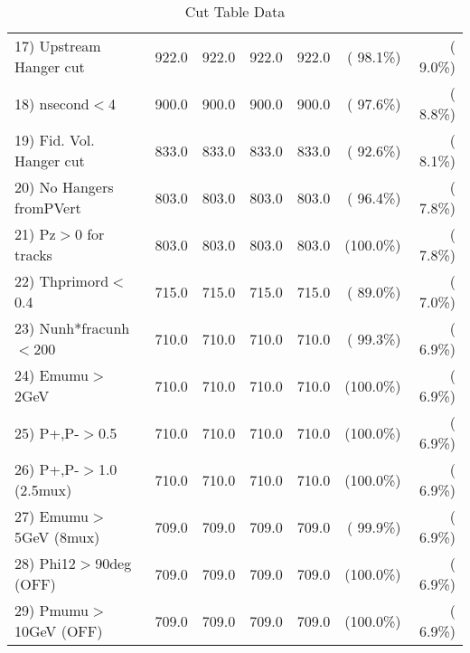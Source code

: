 \begin{table}[h!]
\begin{tabular}{||l||r|r|r|r|r|r||}
 17) Upstream Hanger cut  &        922.0 &        922.0 &        922.0 &        922.0 & ( 98.1\%) & (  9.0\%) \\
 18) nsecond$<$4          &        900.0 &        900.0 &        900.0 &        900.0 & ( 97.6\%) & (  8.8\%) \\
 19) Fid. Vol. Hanger cut &        833.0 &        833.0 &        833.0 &        833.0 & ( 92.6\%) & (  8.1\%) \\
 20) No Hangers fromPVert &        803.0 &        803.0 &        803.0 &        803.0 & ( 96.4\%) & (  7.8\%) \\
 21) Pz$>$0 for tracks    &        803.0 &        803.0 &        803.0 &        803.0 & (100.0\%) & (  7.8\%) \\
 22) Thprimord$<$0.4      &        715.0 &        715.0 &        715.0 &        715.0 & ( 89.0\%) & (  7.0\%) \\
 23) Nunh*fracunh$<$200   &        710.0 &        710.0 &        710.0 &        710.0 & ( 99.3\%) & (  6.9\%) \\
 24) Emumu$>$2GeV         &        710.0 &        710.0 &        710.0 &        710.0 & (100.0\%) & (  6.9\%) \\
 25) P+,P-$>$0.5          &        710.0 &        710.0 &        710.0 &        710.0 & (100.0\%) & (  6.9\%) \\
 26) P+,P-$>$1.0 (2.5mux) &        710.0 &        710.0 &        710.0 &        710.0 & (100.0\%) & (  6.9\%) \\
 27) Emumu$>$5GeV  (8mux) &        709.0 &        709.0 &        709.0 &        709.0 & ( 99.9\%) & (  6.9\%) \\
 28) Phi12$>$90deg  (OFF) &        709.0 &        709.0 &        709.0 &        709.0 & (100.0\%) & (  6.9\%) \\
 29) Pmumu$>$10GeV  (OFF) &        709.0 &        709.0 &        709.0 &        709.0 & (100.0\%) & (  6.9\%) \\
 \hline
 \hline
 \end{tabular}
 \caption{Cut Table  Data     }
 \label{tab-cutcohjpsi-mumu_data}
 \end{table}
